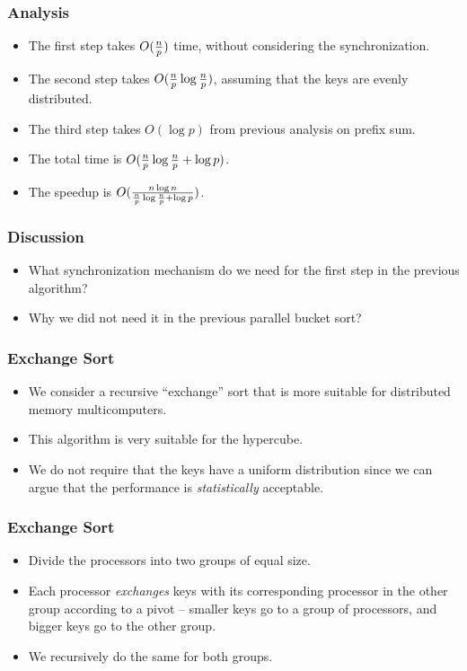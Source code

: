 \documentclass{beamer}
\begin{document}
\begin{CJK}{UTF8}{bsmi}
\begin{frame}
\frametitle{Analysis}
\begin{itemize}
\item The first step takes $O({n \over p})$ time, without considering
  the synchronization.
\item The second step takes $O({n \over p} \log {n \over p})$,
  assuming that the keys are evenly distributed.
\item The third step takes $O(\log p)$ from previous analysis
  on prefix sum.
\item The total time is $O({n \over p} \log {n \over p} + \log p)$.
\item The speedup is $O({{n \log n} \over {{{n \over p} \log {n \over
      p} + \log p}}})$.
\end{itemize}
\end{frame}


\begin{frame}
\frametitle{Discussion}
\begin{itemize}
\item What synchronization mechanism do we need for the first step in
  the previous algorithm?  
\item Why we did not need it in the previous parallel bucket sort?
\end{itemize}
\end{frame}

\begin{frame}
\frametitle{Exchange Sort}

\begin{itemize}
\item We consider a recursive ``exchange'' sort that is more suitable for distributed memory multicomputers.
\item This algorithm is very suitable for the hypercube.
\item We do not require that the keys have a uniform distribution since we can argue that the performance is {\em statistically} acceptable.
\end{itemize}
\end{frame}

\begin{frame}
\frametitle{Exchange Sort}
\begin{itemize}
\item Divide the processors into two groups of equal size.
\item Each processor {\em exchanges} keys with its corresponding processor in the other group according to a pivot -- smaller keys go to a group of processors, and bigger keys go to the other group.
\item We recursively do the same for both groups.
\end{itemize}
\end{frame}


\end{CJK}
\end{document}
